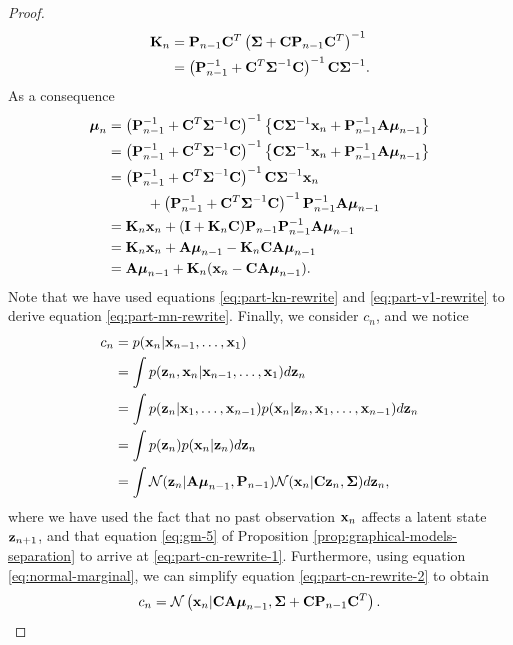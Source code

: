 \documentclass[12pt, oneside]{book}
\numberwithin{equation}{section}
\newcommand{\x}{{\bf x}}
\newcommand{\z}{{\bf z}}
\newcommand{\N}{\mathcal{N}}
\begin{document}
{\begin{proof}
	\begin{align}
		{\bf K}_n &= {\bf P}_{n-1} {\bf C}^T\left(\boldsymbol\Sigma + {\bf C}{\bf P}_{n-1}{\bf C}^T\right)^{-1} \\
				  &= \left({\bf P}_{n-1}^{-1} + {\bf C}^T\boldsymbol\Sigma^{-1}{\bf C}\right)^{-1}{\bf C}\boldsymbol\Sigma^{-1}. \label{eq:part-kn-rewrite}
	\end{align}
	As a consequence
	\begin{align}
		\boldsymbol{\mu}_n &= \left({\bf P}_{n-1}^{-1} + {\bf C}^T \boldsymbol\Sigma^{-1}{\bf C}\right)^{-1} \left\{{\bf C}\boldsymbol\Sigma^{-1}\x_n + {\bf P}_{n-1}^{-1}{\bf A}\boldsymbol\mu_{n-1}\right\}\\
		&= \left({\bf P}_{n-1}^{-1} + {\bf C}^T \boldsymbol\Sigma^{-1}{\bf C}\right)^{-1} \left\{{\bf C}\boldsymbol\Sigma^{-1}\x_n + {\bf P}_{n-1}^{-1}{\bf A}\boldsymbol\mu_{n-1}\right\}\\
		&= \left({\bf P}_{n-1}^{-1} + {\bf C}^T \boldsymbol\Sigma^{-1}{\bf C}\right)^{-1} {\bf C}\boldsymbol\Sigma^{-1}\x_n \nonumber\\
		& \hspace{1cm} + \left({\bf P}_{n-1}^{-1} + {\bf C}^T \boldsymbol\Sigma^{-1}{\bf C}\right)^{-1}{\bf P}_{n-1}^{-1}{\bf A}\boldsymbol\mu_{n-1}\\
		&= 	{\bf K}_n \x_n + ({\bf I} + {\bf K}_n {\bf C}){\bf P}_{n-1}{\bf P}_{n-1}^{-1}{\bf A}\boldsymbol\mu_{n-1} \label{eq:part-mn-rewrite}\\
		&= {\bf K}_n \x_n + {\bf A}\boldsymbol\mu_{n-1} - {\bf K}_n {\bf C}{\bf A}\boldsymbol\mu_{n-1}\\
		&= {\bf A}\boldsymbol{\mu}_{n-1} + {\bf K}_{n}(\x_n - {\bf CA}\boldsymbol\mu_{n-1}).
	\end{align}
	Note that we have used equations \eqref{eq:part-kn-rewrite} and \eqref{eq:part-v1-rewrite} to derive equation \eqref{eq:part-mn-rewrite}.
	Finally, we consider $c_n$, and we notice
	\begin{align}
		c_n &= p(\x_n \vert \x_{n-1}, \ldots, \x_1)\\
			&= \int p(\z_n, \x_n \vert \x_{n-1}, \ldots, \x_1) d\z_n\\
			&= \int p(\z_n \vert \x_1, \ldots, \x_{n-1}) p (\x_n \vert \z_n, \x_1, \ldots, \x_{n-1}) d\z_n \\
			&= \int p(\z_n) p (\x_n \vert \z_n) d\z_n \label{eq:part-cn-rewrite-1} \\
			&= \int \N(\z_n\vert {\bf A} \boldsymbol\mu_{n-1}, {\bf P}_{n-1}) \N(\x_n \vert {\bf C}\z_n, \boldsymbol\Sigma) d\z_n, \label{eq:part-cn-rewrite-2}
	\end{align}
	where we have used the fact that no past observation $\x_n$ affects a latent state $\z_{n+1}$, and that equation \eqref{eq:gm-5} of Proposition \ref{prop:graphical-models-separation} to arrive at \eqref{eq:part-cn-rewrite-1}. Furthermore, using equation \eqref{eq:normal-marginal}, we can  simplify equation \eqref{eq:part-cn-rewrite-2} to obtain
	\begin{equation}
		c_n = \N\left(\x_n \vert {\bf C}{\bf A}\boldsymbol\mu_{n-1}, \boldsymbol\Sigma + {\bf C}{\bf P}_{n-1}{\bf C}^T\right).
	\end{equation}	
\end{proof}

}
\end{document}
